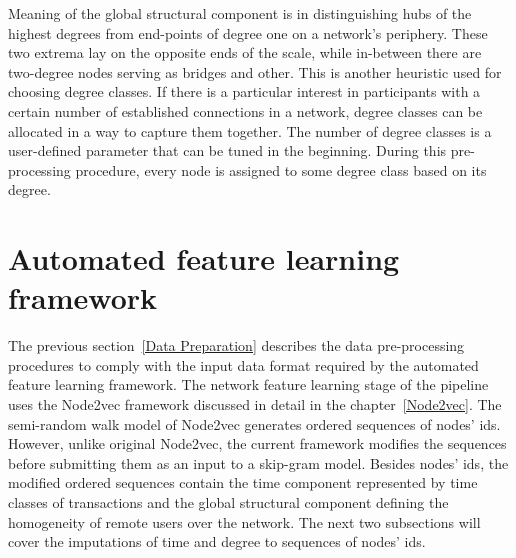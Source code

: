 Meaning of the global structural component is in distinguishing hubs of the highest degrees from end-points of degree one on a network's periphery. These two extrema lay on the opposite ends of the scale, while in-between there are two-degree nodes serving as bridges and other. This is another heuristic used for choosing degree classes. If there is a particular interest in participants with a certain number of established connections in a network, degree classes can be allocated in a way to capture them together. The number of degree classes is a user-defined parameter that can be tuned in the beginning. During this pre-processing procedure, every node is assigned to some degree class based on its degree.

\section{Automated feature learning framework}
\label{Automated Feature Learning Framework}
The previous section~\ref{Data Preparation} describes the data pre-processing procedures to comply with the input data format required by the automated feature learning framework. The network feature learning stage of the pipeline uses the Node2vec framework discussed in detail in the chapter~\ref{Node2vec}. The semi-random walk model of Node2vec generates ordered sequences of nodes' ids. However, unlike original Node2vec, the current framework modifies the sequences before submitting them as an input to a skip-gram model. Besides nodes' ids, the modified ordered sequences contain the time component represented by time classes of transactions and the global structural component defining the homogeneity of remote users over the network. The next two subsections will cover the imputations of time and degree to sequences of nodes' ids.

